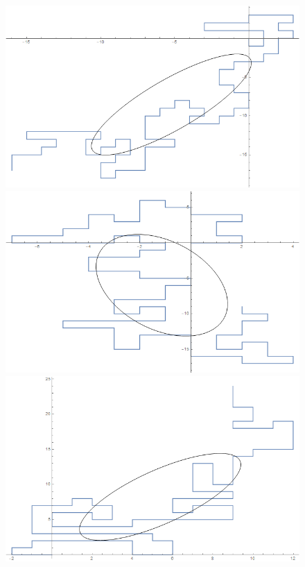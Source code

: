 \begin{figure}
\begin{minipage}[h]{0.5\linewidth}
     \includegraphics[width=\linewidth]{Sections/Images/GyrationEllipse.png}
\end{minipage}
\hfill
\begin{minipage}[h]{0.5\linewidth}
    \includegraphics[width=\linewidth]{Sections/Images/GyrationEllipse2.png}
\end{minipage}
\vfill
\begin{minipage}[h]{0.5\linewidth}
     \includegraphics[width=\linewidth]{Sections/Images/GyrationEllipse3.png}

\end{minipage}
\end{figure}
